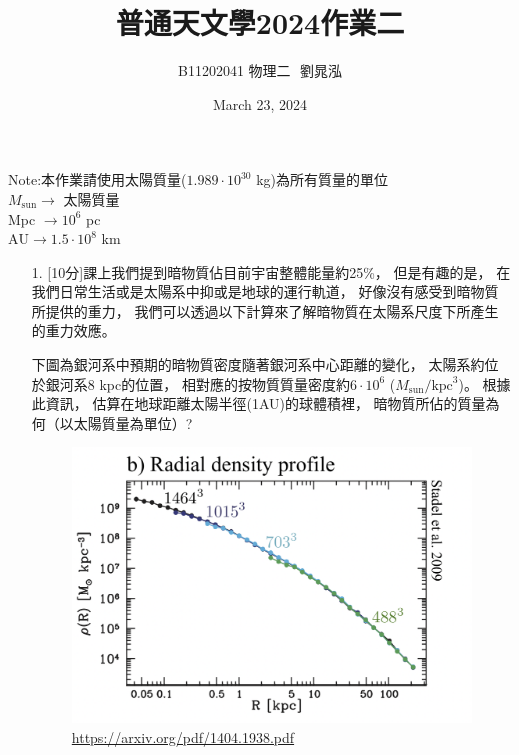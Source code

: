 \documentclass{article}
\title{普通天文學2024作業二}
\author{B11202041 物理二 $ $ 劉晁泓}
\date{March 23, 2024}
\theoremstyle{definition}
\begin{document}
\maketitle
\thispagestyle{fancy}
\renewcommand{\footrulewidth}{0.4pt}
\cfoot{\thepage}
\renewcommand{\headrulewidth}{0.4pt}

\setlength{\parindent}{0pt}
Note:本作業請使用太陽質量($1.989 \cdot 10^{30}$ kg)為所有質量的單位\\
$M_{\text{sun}} \rightarrow$ 太陽質量\\
Mpc $\rightarrow 10^6$ pc\\
$\text{AU} \rightarrow 1.5 \cdot 10^8$ km

\setlength{\parindent}{20pt}
\begin{enumerate}
	\item[1.] [10分]課上我們提到暗物質佔目前宇宙整體能量約25\%，
		但是有趣的是，
		在我們日常生活或是太陽系中抑或是地球的運行軌道，
		好像沒有感受到暗物質所提供的重力，
		我們可以透過以下計算來了解暗物質在太陽系尺度下所產生的重力效應。\\
		\par 下圖為銀河系中預期的暗物質密度隨著銀河系中心距離的變化，
		太陽系約位於銀河系8 kpc的位置，
		相對應的按物質質量密度約$6 \cdot 10^6$ ($M_{\text{sun}}/\text{kpc}^3$)。
		根據此資訊，
		估算在地球距離太陽半徑(1AU)的球體積裡，
		暗物質所佔的質量為何（以太陽質量為單位）?

		\begin{figure}[h]
			\centering
			\includegraphics[scale = 0.2]{hw2-1.png}
			\caption{\url{https://arxiv.org/pdf/1404.1938.pdf}}
			\label{fig1}
		\end{figure}


\end{enumerate}
\end{document}
